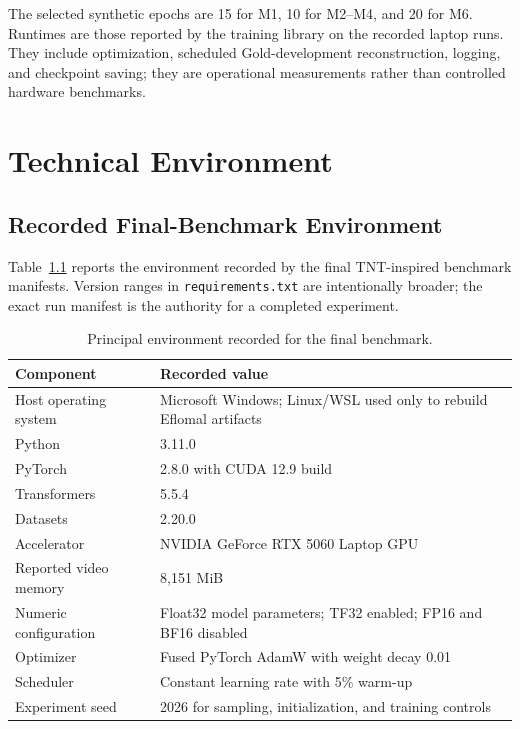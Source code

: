 \documentclass[12pt, a4paper, twoside, openany]{report}
\begin{document}
The selected synthetic epochs are 15 for M1, 10 for M2--M4, and 20 for M6. Runtimes are those reported by the training library on the recorded laptop runs. They include optimization, scheduled Gold-development reconstruction, logging, and checkpoint saving; they are operational measurements rather than controlled hardware benchmarks.

\chapter{Technical Environment}
\label{app:env}

\section{Recorded Final-Benchmark Environment}

Table~\ref{tab:environment} reports the environment recorded by the final TNT-inspired benchmark manifests. Version ranges in \texttt{requirements.txt} are intentionally broader; the exact run manifest is the authority for a completed experiment.

\begin{table}[H]
  \centering
  \caption{Principal environment recorded for the final benchmark.}
  \label{tab:environment}
  \begin{tabularx}{\textwidth}{>{\raggedright\arraybackslash}p{4.6cm}X}
    \toprule
    \textbf{Component} & \textbf{Recorded value} \\
    \midrule
    Host operating system & Microsoft Windows; Linux/WSL used only to rebuild Eflomal artifacts \\
    Python & 3.11.0 \\
    PyTorch & 2.8.0 with CUDA 12.9 build \\
    Transformers & 5.5.4 \\
    Datasets & 2.20.0 \\
    Accelerator & NVIDIA GeForce RTX 5060 Laptop GPU \\
    Reported video memory & 8,151 MiB \\
    Numeric configuration & Float32 model parameters; TF32 enabled; FP16 and BF16 disabled \\
    Optimizer & Fused PyTorch AdamW with weight decay 0.01 \\
    Scheduler & Constant learning rate with 5\% warm-up \\
    Experiment seed & 2026 for sampling, initialization, and training controls \\
    \bottomrule
  \end{tabularx}
\end{table}
\end{document}

